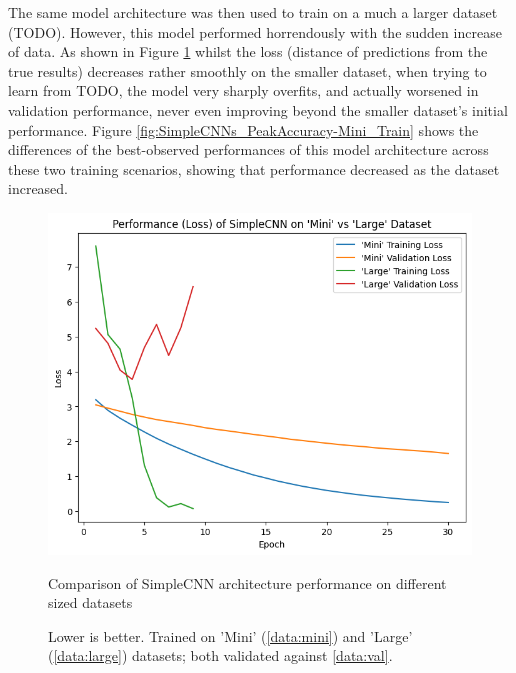                 The same model architecture was then used to train on a much a larger dataset (TODO). However, this model performed horrendously with the sudden increase of data. As shown in Figure \ref{fig:SimpleCNNs_TrainLoss-Mini_Train} whilst the loss (distance of predictions from the true results) decreases rather smoothly on the smaller dataset, when trying to learn from TODO, the model very sharply overfits, and actually worsened in validation performance, never even improving beyond the smaller dataset's initial performance. Figure \ref{fig:SimpleCNNs_PeakAccuracy-Mini_Train} shows the differences of the best-observed performances of this model architecture across these two training scenarios, showing that performance decreased as the dataset increased.
        
                \begin{figure}[h]
                    \centering
                    \includegraphics[width=\textwidth]{images/SimpleCNNs_TrainLoss.png}
                    \caption{Comparison of SimpleCNN architecture performance on different sized datasets}
                    \label{fig:SimpleCNNs_TrainLoss-Mini_Train}
                    \caption*{Lower is better. Trained on 'Mini' (\ref{data:mini}) and 'Large' (\ref{data:large}) datasets; both validated against \ref{data:val}.}
                \end{figure}
        
